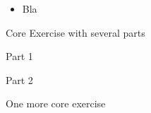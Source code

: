 \begin{lesson}

	\begin{itemize}
		\item Bla
	\end{itemize}
	

\end{lesson}




\newpage

\question
	Core Exercise with several parts
\begin{parts}
	\item Part 1
	\item Part 2
\end{parts}

\bookonlynewpage


\question
	One more core exercise



